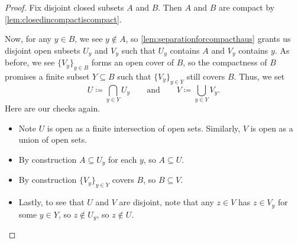 \documentclass[../notes.tex]{subfiles}
\begin{document}
\begin{proof}
	Fix disjoint closed subsets $A$ and $B$. Then $A$ and $B$ are compact by \autoref{lem:closedincompactiscompact}.

	Now, for any $y\in B$, we see $y\notin A$, so \autoref{lem:separationforcompacthaus} grants us disjoint open subsets $U_y$ and $V_y$ such that $U_y$ contains $A$ and $V_y$ contains $y$. As before, we see $\{V_y\}_{y\in B}$ forms an open cover of $B$, so the compactness of $B$ promises a finite subset $Y\subseteq B$ such that $\{V_y\}_{y\in Y}$ still covers $B$. Thus, we set
	\[U\coloneqq\bigcap_{y\in Y}U_y\qquad\text{and}\qquad V\coloneqq\bigcup_{y\in Y}V_y.\]
	Here are our checks again.
	\begin{itemize}
		\item Note $U$ is open as a finite intersection of open sets. Similarly, $V$ is open as a union of open sets.
		\item By construction $A\subseteq U_y$ for each $y$, so $A\subseteq U$.
		\item By construction $\{V_y\}_{y\in Y}$ covers $B$, so $B\subseteq V$.
		\item Lastly, to see that $U$ and $V$ are disjoint, note that any $z\in V$ has $z\in V_y$ for some $y\in Y$, so $z\notin U_y$, so $z\notin U$.
		\qedhere
	\end{itemize}
\end{proof}
\end{document}
